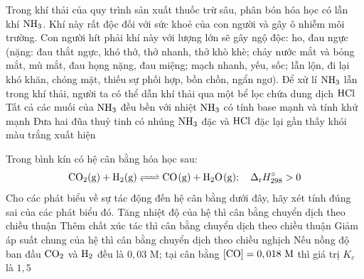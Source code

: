 \documentclass[11pt,a4paper]{article}
\begin{document}
\begin{ex}
Trong khí thải của quy trình sản xuất thuốc trừ sâu, phân bón hóa học có lẫn khí $\ce{NH3}$. Khí này rất độc đối với sức khoẻ của con người và gây ô nhiễm môi trường. Con người hít phải khí này với lượng lớn sẽ gây ngộ độc: ho, đau ngực (nặng: đau thắt ngực, khó thở, thở nhanh, thở khò khè; chảy nước mắt và bỏng mắt, mù mắt, đau họng nặng, đau miệng; mạch nhanh, yếu, sốc; lẫn lộn, đi lại khó khăn, chóng mặt, thiếu sự phối hợp, bồn chồn, ngẩn ngơ).
\choiceTF
{\True Để xử lí $\ce{NH3}$ lẫn trong khí thải, người ta có thể dẫn khí thải qua một bể lọc chứa dung dịch $\ce{HCl}$}
{Tất cả các muối của $\ce{NH3}$ đều bền với nhiệt}
{$\ce{NH3}$ có tính base mạnh và tính khử mạnh}
{\True Đưa hai đũa thuỷ tinh có nhúng $\ce{NH3}$ đặc và $\ce{HCl}$ đặc lại gần thấy khói màu trắng xuất hiện}

\end{ex}
\begin{ex}
Trong bình kín có hệ cân bằng hóa học sau:
$$\ce{CO2(g) + H2(g) <=> CO(g) + H2O(g)};\quad \Delta_{\mathrm{r}}H^{\circ}_{298} > 0$$
Cho các phát biểu về sự tác động đến hệ cân bằng dưới đây, hãy xét tính đúng sai của các phát biểu đó.
\choiceTF
{\True Tăng nhiệt độ của hệ thì cân bằng chuyển dịch theo chiều thuận}
{Thêm chất xúc tác thì cân bằng chuyển dịch theo chiều thuận}
{Giảm áp suất chung của hệ thì cân bằng chuyển dịch theo chiều nghịch}
{Nếu nồng độ ban đầu $\ce{CO2}$ và $\ce{H2}$ đều là $0,03\text{ M}$; tại cân bằng $[\ce{CO}] = 0,018\text{ M}$ thì giá trị $K_c$ là $1,5$}

\end{ex}
\end{document}
